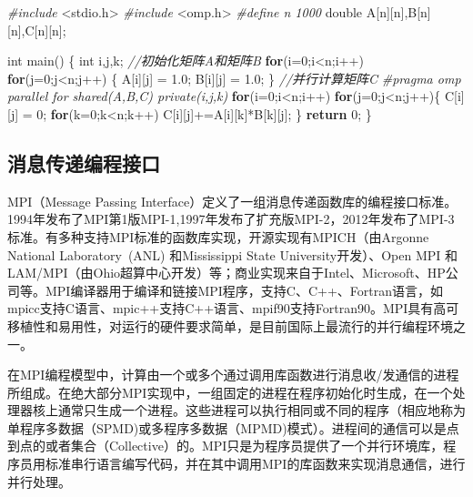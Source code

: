 \documentclass[]{ctexbook}
\newenvironment{Shaded}{\begin{snugshade}}{\end{snugshade}}
\newcommand{\CommentTok}[1]{\textcolor[rgb]{0.56,0.35,0.01}{\textit{#1}}}
\newcommand{\ControlFlowTok}[1]{\textcolor[rgb]{0.13,0.29,0.53}{\textbf{#1}}}
\newcommand{\DataTypeTok}[1]{\textcolor[rgb]{0.13,0.29,0.53}{#1}}
\newcommand{\DecValTok}[1]{\textcolor[rgb]{0.00,0.00,0.81}{#1}}
\newcommand{\FloatTok}[1]{\textcolor[rgb]{0.00,0.00,0.81}{#1}}
\newcommand{\ImportTok}[1]{#1}
\newcommand{\NormalTok}[1]{#1}
\newcommand{\PreprocessorTok}[1]{\textcolor[rgb]{0.56,0.35,0.01}{\textit{#1}}}
\begin{document}
\begin{Shaded}
\begin{Highlighting}[]
\PreprocessorTok{\#include }\ImportTok{\textless{}stdio.h\textgreater{}}
\PreprocessorTok{\#include }\ImportTok{\textless{}omp.h\textgreater{}}
\PreprocessorTok{\#define n 1000}
\DataTypeTok{double}\NormalTok{ A[n][n],B[n][n],C[n][n];}

\DataTypeTok{int}\NormalTok{ main()}
\NormalTok{\{}
    \DataTypeTok{int}\NormalTok{ i,j,k;}
   \CommentTok{//初始化矩阵A和矩阵B}
    \ControlFlowTok{for}\NormalTok{(i=}\DecValTok{0}\NormalTok{;i\textless{}n;i++)}
    \ControlFlowTok{for}\NormalTok{(j=}\DecValTok{0}\NormalTok{;j\textless{}n;j++) \{}
\NormalTok{        A[i][j] = }\FloatTok{1.0}\NormalTok{;}
\NormalTok{        B[i][j] = }\FloatTok{1.0}\NormalTok{;}
\NormalTok{    \}   }
    \CommentTok{//并行计算矩阵C}
    \PreprocessorTok{\#pragma omp parallel for shared(A,B,C) private(i,j,k)}
    \ControlFlowTok{for}\NormalTok{(i=}\DecValTok{0}\NormalTok{;i\textless{}n;i++)}
    \ControlFlowTok{for}\NormalTok{(j=}\DecValTok{0}\NormalTok{;j\textless{}n;j++)\{}
\NormalTok{        C[i][j] = }\DecValTok{0}\NormalTok{;}
    \ControlFlowTok{for}\NormalTok{(k=}\DecValTok{0}\NormalTok{;k\textless{}n;k++)}
\NormalTok{        C[i][j]+=A[i][k]*B[k][j];}
\NormalTok{     \}}
    \ControlFlowTok{return} \DecValTok{0}\NormalTok{;}
\NormalTok{\}}
\end{Highlighting}
\end{Shaded}

\hypertarget{ux6d88ux606fux4f20ux9012ux7f16ux7a0bux63a5ux53e3}{%
\subsection{消息传递编程接口}\label{ux6d88ux606fux4f20ux9012ux7f16ux7a0bux63a5ux53e3}}

MPI（Message Passing Interface）定义了一组消息传递函数库的编程接口标准。1994年发布了MPI第1版MPI-1,1997年发布了扩充版MPI-2，2012年发布了MPI-3标准。有多种支持MPI标准的函数库实现，开源实现有MPICH（由Argonne National Laboratory~(ANL) 和Mississippi State University开发）、Open MPI 和LAM/MPI（由Ohio超算中心开发）等；商业实现来自于Intel、Microsoft、HP公司等。MPI编译器用于编译和链接MPI程序，支持C、C++、Fortran语言，如mpicc支持C语言、mpic++支持C++语言、mpif90支持Fortran90。MPI具有高可移植性和易用性，对运行的硬件要求简单，是目前国际上最流行的并行编程环境之一。

在MPI编程模型中，计算由一个或多个通过调用库函数进行消息收/发通信的进程所组成。在绝大部分MPI实现中，一组固定的进程在程序初始化时生成，在一个处理器核上通常只生成一个进程。这些进程可以执行相同或不同的程序（相应地称为单程序多数据（SPMD)或多程序多数据（MPMD)模式）。进程间的通信可以是点到点的或者集合（Collective）的。MPI只是为程序员提供了一个并行环境库，程序员用标准串行语言编写代码，并在其中调用MPI的库函数来实现消息通信，进行并行处理。
\end{document}
